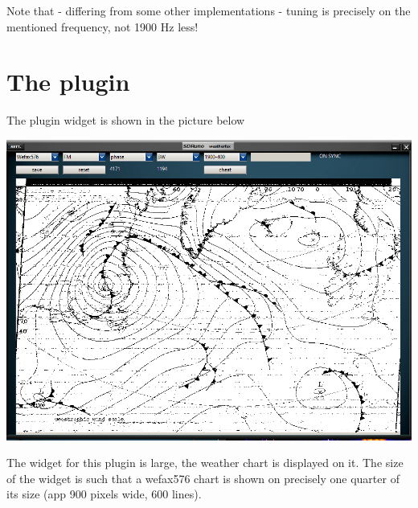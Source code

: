 \documentclass[11pt]{article}
\begin{document}
Note that - differing from some other implementations - tuning is
precisely on the mentioned frequency, not 1900 Hz less!
\section{The plugin}
The plugin widget is shown in the picture below

\includegraphics[width=140mm]{wfax-example-2.png}

The widget for this plugin is large, the weather chart is displayed
on it. The size of the widget is such that a wefax576 chart is shown
on precisely one quarter of its size (app 900 pixels wide, 600 lines).
\end{document}
